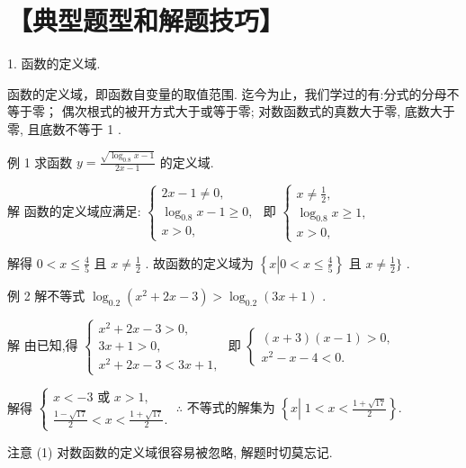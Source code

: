 \documentclass[10pt]{article}
\begin{document}
\section*{【典型题型和解题技巧】}

1. 函数的定义域.

函数的定义域，即函数自变量的取值范围. 迄今为止，我们学过的有:分式的分母不等于零； 偶次根式的被开方式大于或等于零; 对数函数式的真数大于零, 底数大于零, 且底数不等于 1 .

例 1 求函数 \(y = \frac{\sqrt{{\log }_{0.8}x - 1}}{{2x} - 1}\) 的定义域.

解 函数的定义域应满足: \(\left\{  \begin{array}{l} {2x} - 1 \neq  0, \\  {\log }_{0.8}x - 1 \geq  0, \\  x > 0, \end{array}\right.\) 即 \(\left\{  \begin{array}{l} x \neq  \frac{1}{2}, \\  {\log }_{0.8}x \geq  1, \\  x > 0, \end{array}\right.\)

解得 \(0 < x \leq  \frac{4}{5}\) 且 \(x \neq  \frac{1}{2}\) . 故函数的定义域为 \(\left\{  {x\left| {0 < x \leq  \frac{4}{5}}\right. }\right\}\) 且 \(x \neq  \frac{1}{2}\}\) .

例 2 解不等式 \({\log }_{0.2}\left( {{x}^{2} + {2x} - 3}\right)  > {\log }_{0.2}\left( {{3x} + 1}\right)\) .

解 由已知,得 \(\left\{  \begin{array}{l} {x}^{2} + {2x} - 3 > 0, \\  {3x} + 1 > 0, \\  {x}^{2} + {2x} - 3 < {3x} + 1, \end{array}\right.\) 即 \(\left\{  \begin{array}{l} \left( {x + 3}\right) \left( {x - 1}\right)  > 0, \\  {x}^{2} - x - 4 < 0. \end{array}\right.\)

解得 \(\left\{  {\begin{array}{l} x <  - 3\text{ 或 }x > 1, \\  \frac{1 - \sqrt{17}}{2} < x < \frac{1 + \sqrt{17}}{2}. \end{array}\;\therefore \text{ 不等式的解集为 }\left\{  {x\left| {\;1 < x < \frac{1 + \sqrt{17}}{2}}\right. }\right\}  .}\right.\)

注意 (1) 对数函数的定义域很容易被忽略, 解题时切莫忘记.
\end{document}
